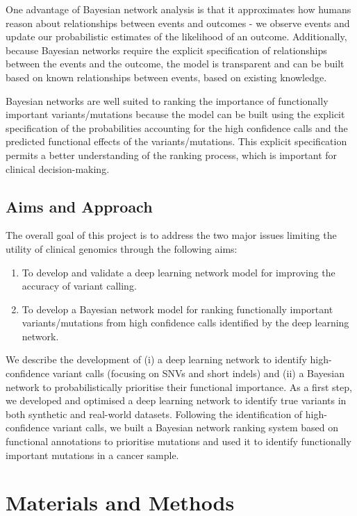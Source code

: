 \documentclass{article}
\begin{document}
One advantage of Bayesian network analysis is that it approximates how humans reason about relationships between events and outcomes - we observe events and update our probabilistic estimates of the likelihood of an outcome. Additionally, because Bayesian networks require the explicit specification of relationships between the events and the outcome, the model is transparent and can be built based on known relationships between events, based on existing knowledge.

Bayesian networks are well suited to ranking the importance of functionally important variants/mutations because the model can be built using the explicit specification of the probabilities accounting for the high confidence calls and the predicted functional effects of the variants/mutations. This explicit specification permits a better understanding of the ranking process, which is important for clinical decision-making.
\subsection{Aims and Approach}
The overall goal of this project is to address the two major issues limiting the utility of clinical genomics through the following aims:
\begin{enumerate} 
    \item To develop and validate a deep learning network model for improving the accuracy of variant calling.
    \item To develop a Bayesian network model for ranking functionally important variants/mutations from high confidence calls identified by the deep learning network.
\end{enumerate}

 We describe the development of (i) a deep learning network to identify high-confidence variant calls (focusing on SNVs and short indels) and (ii) a Bayesian network to probabilistically prioritise their functional importance. As a first step, we developed and optimised a deep learning network to identify true variants in both synthetic and real-world datasets. Following the identification of high-confidence variant calls, we built a Bayesian network ranking system based on functional annotations to prioritise mutations and used it to identify functionally important mutations in a cancer sample.
\newpage
\section{Materials and Methods}
\end{document}
